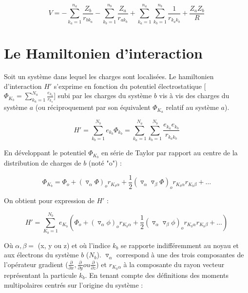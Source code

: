	\begin{equation}
	V = - \sum_{k_{a}=1}^{n_{a}} \frac{Z_{b}}{r_{bk_{a}}} - \sum_{k_{b}=1}^{n_{b}} \frac{Z_{a}}{r_{ak_{b}}} + \sum_{k_{a}=1}^{n_{a}} \sum_{k_{b}=1}^{n_{b}} \frac{1}{r_{k_{a}k_{b}}} + \frac{Z_{a} Z_{b}}{R}
	\end{equation}
	
	
	\section{Le Hamiltonien d'interaction}
	
	
	Soit un système dans lequel les charges sont localisées. Le hamiltonien d'interaction $H'$ s'exprime en fonction du potentiel électrostatique [$\Phi_{K_{b}}= \sum_{k_{a}=1}^{N_{a}} \frac{e_{k_{a}}}{r_{k_{a}}}$] subi par les charges du système $b$ vis à vis des charges du système $a$ (ou réciproquement par son équivalent $\Phi_{K_{a}}$ relatif au système $a$).
	
	\begin{equation}
	H' = \sum_{k_{b}=1}^{N_{b}} e_{k_{b}} \Phi_{k_{b}} = \sum_{k_{a}=1}^{N_{a}} \sum_{k_{b}=1}^{N_{b}} \frac{e_{k_{a}} e_{k_{b}}}{r_{k_{a}k_{b}}}
	\end{equation}
	
	En développant le potentiel $\Phi_{K_{b}}$ en série de Taylor par rapport au centre de la distribution de charges de $b$ (noté "o") :
	
	\begin{equation}
	\Phi_{K_{b}} = \Phi_{o} + (\triangledown_{\alpha} \Phi)_{o} r_{K_{b}\alpha} + \frac{1}{2} (\triangledown_{\alpha} \triangledown_{\beta} \Phi)_{o} r_{K_{b}\alpha} r_{K_{b}\beta} + \ldots
	\end{equation}
	
	On obtient pour expression de $H'$ : 
	
	\begin{equation}
	H' = \sum_{K_{b}=1}^{N_{b}} e_{K_{b}} \left(\Phi_{o} + (\triangledown_{\alpha} \phi)_{o} r_{K_{b}\alpha} + \frac{1}{2}(\triangledown_{\alpha} \triangledown_{\beta}\phi)_{o} r_{K_{b}\alpha} r_{K_{b}\beta} + \ldots \right)
	\end{equation}
	
	Où $\alpha,\beta=$ (x, y ou z) et où l'indice $k_{b}$ se rapporte indifféremment au noyau et aux électrons du système $b$ ($N_{b}$). $\triangledown_{\alpha}$ correspond à une des trois composantes de l'opérateur gradient ($\frac{\partial}{\partial x}, \frac{\partial}{\partial y} ou \frac{\partial}{\partial z}$) et $r_{K_{b}\alpha}$ à la composante du rayon vecteur représentant la particule $k_{b}$. En tenant compte des définitions des moments multipolaires centrés sur l'origine du système : 
	
